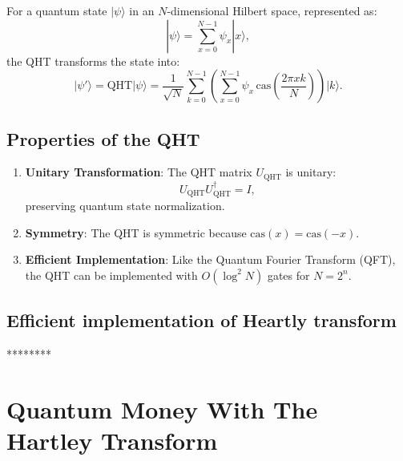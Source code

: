 \documentclass[11pt]{article}
\theoremstyle{definition}
\begin{document}
For a quantum state \( |\psi\rangle \) in an \( N \)-dimensional Hilbert space, represented as:
\[
|\psi\rangle = \sum_{x=0}^{N-1} \psi_x |x\rangle,
\]
the QHT transforms the state into:
\[
|\psi'\rangle = \text{QHT} |\psi\rangle = \frac{1}{\sqrt{N}} \sum_{k=0}^{N-1} \left( \sum_{x=0}^{N-1} \psi_x \, \text{cas}\left(\frac{2\pi x k}{N}\right) \right) |k\rangle.
\]

\subsection*{Properties of the QHT}
\begin{enumerate}
    \item \textbf{Unitary Transformation}: The QHT matrix \( U_{\text{QHT}} \) is unitary:
    \[
    U_{\text{QHT}} U_{\text{QHT}}^\dagger = I,
    \]
    preserving quantum state normalization.
    \item \textbf{Symmetry}: The QHT is symmetric because \( \text{cas}(x) = \text{cas}(-x) \).
    \item \textbf{Efficient Implementation}: Like the Quantum Fourier Transform (QFT), the QHT can be implemented with \( O(\log^2 N) \) gates for \( N = 2^n \).
\end{enumerate}



\subsection*{Efficient implementation of Heartly transform}

********

\section{Quantum Money With The Hartley Transform}
\label{sec:qm_hartley}
\end{document}
